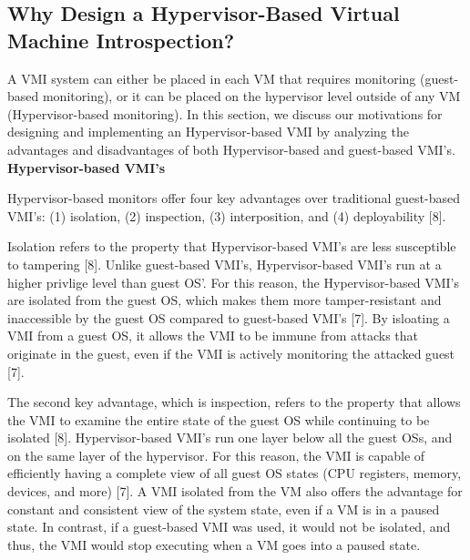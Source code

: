 \documentclass{report}
\begin{document}
\begin{spacing}{1.5}
\subsection{Why Design a Hypervisor-Based Virtual Machine Introspection?}

{\large
A VMI system can either be placed in each VM that requires monitoring (guest-based monitoring), or it can be placed on the hypervisor level outside of any VM (Hypervisor-based monitoring). In this section, we discuss our motivations for designing and implementing an Hypervisor-based VMI by analyzing the advantages and disadvantages of both Hypervisor-based and guest-based VMI's.
\newline \newline
\textbf{Hypervisor-based VMI's}
\newline
}


{\large
Hypervisor-based monitors offer four key advantages over traditional guest-based VMI's: (1) isolation, (2) inspection, (3) interposition, and (4) deployability [8].
\newline
}

{\large
Isolation refers to the property that Hypervisor-based VMI's are less susceptible to tampering [8]. Unlike guest-based VMI's, Hypervisor-based VMI's run at a higher privlige level than guest OS'. For this reason, the Hypervisor-based VMI's are isolated from the guest OS, which makes them more tamper-resistant and inaccessible by the guest OS compared to guest-based VMI's [7]. By isloating a VMI from a guest OS, it allows the VMI to be immune from attacks that originate in the guest, even if the VMI is actively monitoring the attacked guest [7].
\newline
}

{\large
The second key advantage, which is inspection, refers to the property that allows the VMI to examine the entire state of the guest OS while continuing to be isolated [8]. Hypervisor-based VMI's run one layer below all the guest OSs, and on the same layer of the hypervisor. For this reason, the VMI is capable of efficiently having a complete view of all guest OS states (CPU registers, memory, devices, and more) [7]. A VMI isolated from the VM also offers the advantage for constant and consistent view of the system state, even if a VM is in a paused state. In contrast, if a guest-based VMI  was used, it would not be isolated, and thus, the VMI would stop executing when a VM goes into a paused state. 
\newline
}



\end{spacing}
\end{document}
